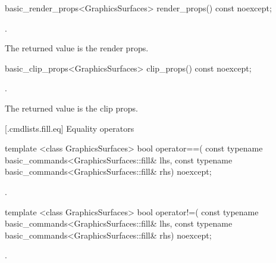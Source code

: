 %
\begin{itemdecl}
basic_render_props<GraphicsSurfaces> render_props() const noexcept;
\end{itemdecl}
\begin{itemdescr}
\pnum
\returns {}.

\pnum
\remarks The returned value is the render props.
\end{itemdescr}

%
\begin{itemdecl}
basic_clip_props<GraphicsSurfaces> clip_props() const noexcept;
\end{itemdecl}
\begin{itemdescr}
\pnum
\returns {}.

\pnum
\remarks The returned value is the clip props.
\end{itemdescr}

 [\iotwod.cmdlists.fill.eq] {Equality operators}%

%
\begin{itemdecl}
template <class GraphicsSurfaces>
bool operator==(
  const typename basic_commands<GraphicsSurfaces::fill& lhs,
  const typename basic_commands<GraphicsSurfaces::fill& rhs) 
  noexcept;
\end{itemdecl}
\begin{itemdescr}
\pnum
\returns {}.
\end{itemdescr}

%
\begin{itemdecl}
template <class GraphicsSurfaces>
bool operator!=(
  const typename basic_commands<GraphicsSurfaces::fill& lhs,
  const typename basic_commands<GraphicsSurfaces::fill& rhs) 
  noexcept;
\end{itemdecl}
\begin{itemdescr}
\pnum
\returns {}.
\end{itemdescr}
